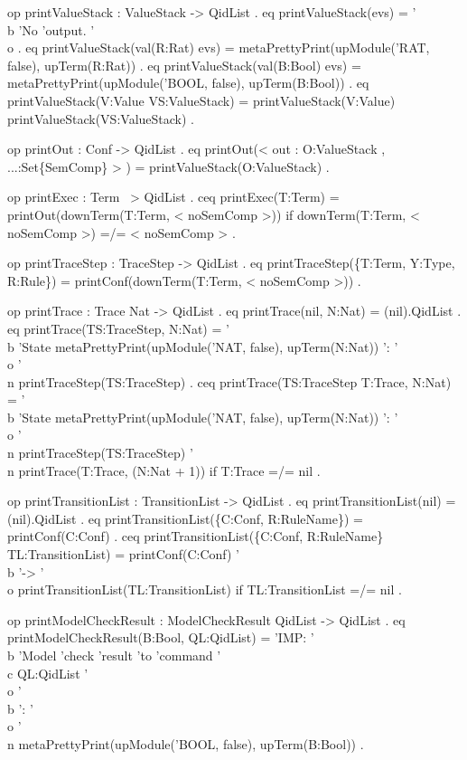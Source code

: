 \documentclass[a4paper,openany]{book}
\begin{document}
 op printValueStack : ValueStack -> QidList .
 eq printValueStack(evs) = '\\b 'No 'output. '\\o .
 eq printValueStack(val(R:Rat) evs) =
    metaPrettyPrint(upModule('RAT, false), upTerm(R:Rat)) .
 eq printValueStack(val(B:Bool) evs) =
    metaPrettyPrint(upModule('BOOL, false), upTerm(B:Bool)) .
 eq printValueStack(V:Value VS:ValueStack) =
    printValueStack(V:Value) printValueStack(VS:ValueStack) .
 
 op printOut : Conf -> QidList .
 eq printOut(< out : O:ValueStack , ...:Set\{SemComp\} > ) =
    printValueStack(O:ValueStack) .

 op printExec : Term ~> QidList .
ceq printExec(T:Term) = printOut(downTerm(T:Term, < noSemComp >))
 if downTerm(T:Term, < noSemComp >) =/= < noSemComp > .

 op printTraceStep : TraceStep -> QidList .
 eq printTraceStep(\{T:Term, Y:Type, R:Rule\}) =
    printConf(downTerm(T:Term, < noSemComp >)) .

 op printTrace : Trace Nat -> QidList .
 eq printTrace(nil, N:Nat) = (nil).QidList .
 eq printTrace(TS:TraceStep, N:Nat) =
    '\\b 'State 
    metaPrettyPrint(upModule('NAT, false), 
     upTerm(N:Nat)) ': '\\o '\\n
    printTraceStep(TS:TraceStep) .
ceq printTrace(TS:TraceStep T:Trace, N:Nat) =
    '\\b 'State 
    metaPrettyPrint(upModule('NAT, false), 
     upTerm(N:Nat)) ': '\\o '\\n
    printTraceStep(TS:TraceStep) '\\n printTrace(T:Trace, (N:Nat + 1))
 if T:Trace =/= nil .

 op printTransitionList : TransitionList -> QidList .
 eq printTransitionList(nil) = (nil).QidList .
 eq printTransitionList(\{C:Conf, R:RuleName\}) = printConf(C:Conf) .
ceq printTransitionList(\{C:Conf, R:RuleName\} TL:TransitionList) =
    printConf(C:Conf) '\\b '-> '\\o printTransitionList(TL:TransitionList)
 if TL:TransitionList =/= nil .

 op printModelCheckResult : ModelCheckResult QidList -> QidList .
 eq printModelCheckResult(B:Bool, QL:QidList) =
    'IMP: '\\b 'Model 'check 'result 'to 'command 
    '\\c QL:QidList '\\o '\\b ': '\\o '\\n
        metaPrettyPrint(upModule('BOOL, false), upTerm(B:Bool)) .
\end{document}
